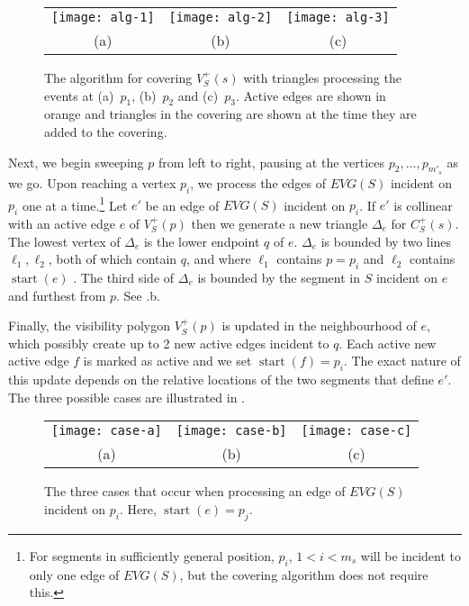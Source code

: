\documentclass{patmorin}
\newcommand{\EVG}{\mathit{EVG}}
\DeclareMathOperator{\start}{start}
\begin{document}
\begin{figure}
  \begin{center}
    \begin{tabular}{ccc}
      \texttt{[image: alg-1]} &
      \texttt{[image: alg-2]} &
      \texttt{[image: alg-3]} \\
      (a) & (b) & (c)
    \end{tabular}
  \end{center}
  \caption{The algorithm for covering $V^+_S(s)$ with triangles processing
           the events at (a)~$p_1$, (b)~$p_2$ and (c)~$p_3$.  
           Active edges are shown in orange and triangles in the covering
are shown at the time they are added to the covering.}
\end{figure}

Next, we begin sweeping $p$ from left to right, pausing at the vertices
$p_2,\ldots,p_{m'_s}$ as we go.  Upon reaching a vertex $p_i$, we process
the edges of $\EVG(S)$ incident on $p_i$ one at a time.\footnote{For
segments in sufficiently general position, $p_i$, $1<i<m_s$ will be
incident to only one edge of $\EVG(S)$, but the covering algorithm does not
require this.}  Let $e'$ be an edge of $\EVG(S)$ incident on $p_i$. If $e'$
is collinear with an active edge $e$ of $V^+_S(p)$ then we generate a new
triangle $\Delta_e$ for $C^+_S(s)$.  The lowest vertex of $\Delta_e$ is the
lower endpoint $q$ of $e$. $\Delta_e$ is bounded by two lines
$\ell_1,\ell_2$, both of which contain $q$, and where $\ell_1$ contains
$p=p_i$ and $\ell_2$ contains $\start(e)$ .  The third side of $\Delta_e$
is bounded by the segment in $S$ incident on $e$ and furthest from $p$. See
.b.

Finally, the visibility polygon $V^+_S(p)$ is updated in the
neighbourhood of $e$, which possibly create up to 2 new active edges
incident to $q$.  Each active new active edge $f$ is marked as active
and we set $\start(f)=p_i$.  The exact nature of this update depends on
the relative locations of the two segments that define $e'$.  The three
possible cases are illustrated in .

\begin{figure}
  \begin{center}
    \begin{tabular}{|c|c|c|}
      \texttt{[image: case-a]} &
      \texttt{[image: case-b]} &
      \texttt{[image: case-c]} \\
      (a) & (b) & (c)
    \end{tabular}
  \end{center}
  \caption{The three cases that occur when processing an edge of $\EVG(S)$
incident on $p_i$.  Here, $\start(e)=p_j$.}
\end{figure}
\end{document}
